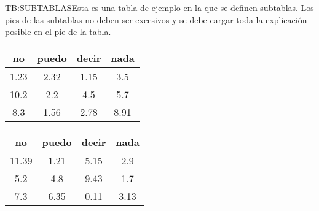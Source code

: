 \begin{table}[Tabla de ejemplo con subtablas]{TB:SUBTABLAS}{Esta es una tabla de ejemplo en la que se definen subtablas. Los pies de las subtablas no deben ser excesivos y se debe cargar toda la explicación posible en el pie de la tabla.}

  {
    \begin{tabular}{cccc}
      \hline
      \textbf{no} & \textbf{puedo} & \textbf{decir} & \textbf{nada} \\
      \hline \hline
      1.23 & 2.32 & 1.15 & 3.5 \\
      10.2 & 2.2 & 4.5 & 5.7 \\
      8.3 & 1.56 & 2.78 & 8.91 \\
      \hline
    \end{tabular}
  }
  {
    \begin{tabular}{cccc}
      \hline
      \textbf{no} & \textbf{puedo} & \textbf{decir} & \textbf{nada} \\
      \hline \hline
      11.39 & 1.21 & 5.15 & 2.9 \\
      5.2 & 4.8 & 9.43 & 1.7 \\
      7.3 & 6.35 & 0.11 & 3.13 \\
      \hline
    \end{tabular}
  }
\end{table}
